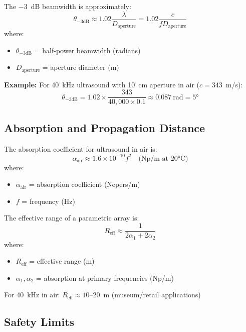 The $-3$~dB beamwidth is approximately:
\begin{equation}
\theta_{-3\text{dB}} \approx 1.02 \frac{\lambda}{D_{\text{aperture}}} = 1.02 \frac{c}{f D_{\text{aperture}}}
\end{equation}
where:
\begin{itemize}
\item $\theta_{-3\text{dB}}$ = half-power beamwidth (radians)
\item $D_{\text{aperture}}$ = aperture diameter (m)
\end{itemize}

\textbf{Example:} For 40~kHz ultrasound with 10~cm aperture in air ($c = 343$~m/s):
\begin{equation}
\theta_{-3\text{dB}} = 1.02 \times \frac{343}{40{,}000 \times 0.1} \approx 0.087~\text{rad} = 5°
\end{equation}

\subsection{Absorption and Propagation Distance}

The absorption coefficient for ultrasound in air is:
\begin{equation}
\alpha_{\text{air}} \approx 1.6 \times 10^{-10} f^2 \quad \text{(Np/m at 20°C)}
\end{equation}
where:
\begin{itemize}
\item $\alpha_{\text{air}}$ = absorption coefficient (Nepers/m)
\item $f$ = frequency (Hz)
\end{itemize}

The effective range of a parametric array is:
\begin{equation}
R_{\text{eff}} \approx \frac{1}{2\alpha_1 + 2\alpha_2}
\end{equation}
where:
\begin{itemize}
\item $R_{\text{eff}}$ = effective range (m)
\item $\alpha_1, \alpha_2$ = absorption at primary frequencies (Np/m)
\end{itemize}

For 40~kHz in air: $R_{\text{eff}} \approx 10$--20~m (museum/retail applications)

\subsection{Safety Limits}

